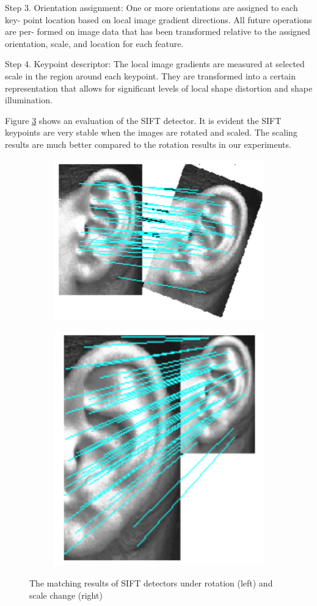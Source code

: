 Step 3. Orientation assignment: One or more orientations are assigned to each key- point location based on local image gradient directions. All future operations are per- formed on image data that has been transformed relative to the assigned orientation, scale, and location for each feature.

Step 4. Keypoint descriptor: The local image gradients are measured at selected scale in the region around each keypoint. They are transformed into a certain representation that allows for significant levels of local shape distortion and shape illumination.

Figure \ref{fig:test4} shows an evaluation of the SIFT detector. It is evident the SIFT keypoints are very stable when the images are rotated and scaled. The scaling results are much better compared to the rotation results in our experiments.
\begin{figure}
\centering
\begin{subfigure}{.5\textwidth}
  \centering
  \includegraphics[width=.5\linewidth]{Figures/Figure11}
  \label{fig:sub11}
\end{subfigure}%
\begin{subfigure}{.5\textwidth}
  \centering
  \includegraphics[width=.5\linewidth]{Figures/Figure12}
  \label{fig:sub12}
\end{subfigure}
\caption{The matching results of SIFT detectors under rotation (left) and scale change (right)}
\label{fig:test4}
\end{figure}
